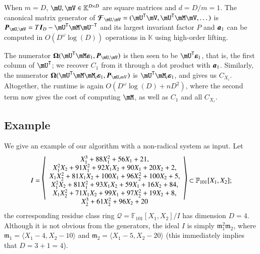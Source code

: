 \documentclass[final,1p,times,authoryear]{elsarticle}
\newcommand{\mat}[1]{\bm{\MakeUppercase{#1}}} %
\newcommand{\row}[1]{\bm{\MakeLowercase{#1}}} %
\newcommand{\col}[1]{\bm{\MakeLowercase{#1}}} %
\newcommand{\seq}{\mat{\mathcal{F}}} %
\newcommand{\minpoly}{P}
\newcommand{\residueI}{\mathscr{Q}}
\newcommand{\trsp}[1]{#1^{\mathsf{T}}} %
\newcommand{\itrsp}[1]{#1^{\mathsf{-T}}} %
\def\F {\ensuremath{\mathbb{F}}}
\def\K{\mathbb{K}}
\def\K {\ensuremath{\mathbb{K}}}
\newcommand{\mUt}{\trsp{\mU}}
\begin{document}
When $m = D$, $\mU,\mV \in \mathbb{K}^{D \times D}$ are square
matrices and $d = D/m = 1$. The canonical matrix generator of
$\seq_{\mU,\mV} = (\mUt\mV, \mUt\mM\mV,\dots)$ is
$\mat{P}_{\mU,\mV} = T \mat{I}_D - \mUt\mM\itrsp{\mU}$ and its
largest invariant factor $\minpoly$ and $\row{a}_1$ can be computed in
$O(D^\omega \log(D))$ operations in $\K$ using high-order lifting.

The numerator $\mat{\Omega}(\mUt \mM \col{\varepsilon}_1,
\mat{P}_{\mU,\mV})$ is then seen to be $\mUt \col{\varepsilon}_1$, that is, the
first column of $\mUt$; we recover $C_1$ from it through a dot
product with $\row{a}_1$. Similarly, the numerator
$\mat{\Omega}(\mUt \mM \mM_i \col{\varepsilon}_1,
\mat{P}_{\mU,mV})$ is $\mUt \mM_i \col{\varepsilon}_1$, and gives
us $C_{X_i}$. Altogether, the runtime is again $O(D^{\omega} \log(D) +
nD^2)$, where the second term now gives the cost of computing $\mM$,
as well as $C_1$ and all $C_{X_i}$.


\subsection{Example}

We give an example of our algorithm with a non-radical system as input. Let
$$
I = 
\sbox0{$\begin{array}{c}
    X_1^3 + 88X_1^2 + 56X_1 + 21,\\
    X_1^2X_2 + 91X_1^2 + 92X_1X_2 + 90X_1 + 20X_2 + 2,\\
    X_1X_2^2 + 81X_1X_2 + 100X_1 + 96X_2^2 + 100X_2 + 5,\\
    X_1^2X_2 + 81X_1^2 + 93X_1X_2 + 59X_1 + 16X_2 + 84,\\
    X_1X_2^2 + 71X_1X_2 + 99X_1 + 97X_2^2 + 19X_2 + 8,\\
    X_2^3 + 61X_2^2 + 96X_2 + 20
\end{array}$}
\mathopen{\resizebox{1.2\width}{\ht0}{$\Bigg\langle$}}
  \usebox{0}
\mathclose{\resizebox{1.2\width}{\ht0}{$\Bigg\rangle$}}
\subset \F_{101}[X_1,X_2];
$$ the corresponding residue class ring $\residueI=\F_{101}[X_1,X_2]/I$
has dimension $D=4$.  Although it is not obvious from the generators,
the ideal $I$ is simply $\mathfrak{m}_1^2 \mathfrak{m}_2$, where
$\mathfrak{m}_1 =\langle X_1-4,X_2-10\rangle$ and $\mathfrak{m}_2
=\langle X_1-5,X_2-20\rangle$ (this immediately implies that $D=3+1=4$).
\end{document}
